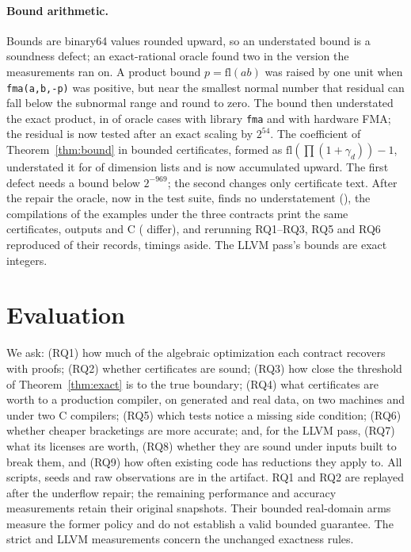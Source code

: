 \documentclass[acmsmall,review,anonymous,nonacm]{acmart}
\newcommand{\fl}{\mathrm{fl}}
\begin{document}
\paragraph{Bound arithmetic.} Bounds are binary64 values rounded upward, so an
understated bound is a soundness defect; an exact-rational oracle found two in
the version the measurements ran on. A product bound $p=\fl(ab)$ was raised by
one unit when \texttt{fma(a,b,-p)} was positive, but near the smallest normal
number that residual can fall below the subnormal range and round to zero. The
bound then understated the exact product, in \RepairMulUnderGeneric{} of
\RepairMulCases{} oracle cases with library \texttt{fma} and
\RepairMulUnderHaswell{} with hardware FMA; the residual is now tested after an
exact scaling by $2^{54}$. The coefficient of Theorem~\ref{thm:bound} in bounded
certificates, formed as $\fl(\prod(1+\gamma_d))-1$, understated it for
\RepairChainUnder{} of \RepairChainCases{} dimension lists and is now
accumulated upward. The first defect needs a bound below $2^{-969}$; the second
changes only certificate text. After the repair the oracle, now in the test
suite, finds no understatement (\RepairAfterUnder), the
\RepairExampleCases{} compilations of the \RepairExamplePrograms{} examples
under the three contracts print the same certificates, outputs and C
(\RepairExampleDiffer{} differ), and rerunning RQ1--RQ3, RQ5 and RQ6
reproduced \RepairRerunIdentical{} of their \RepairRerunRecords{} records,
timings aside. The LLVM pass's bounds are exact integers.

\section{Evaluation}\label{sec:eval}
We ask: (RQ1) how much of the algebraic optimization each contract recovers with
proofs; (RQ2) whether certificates are sound; (RQ3) how close the threshold of
Theorem~\ref{thm:exact} is to the true boundary; (RQ4) what certificates are
worth to a production compiler, on generated and real data, on two machines and
under two C compilers; (RQ5) which tests notice a missing side condition; (RQ6)
whether cheaper bracketings are more accurate; and, for the LLVM pass, (RQ7) what
its licenses are worth, (RQ8) whether they are sound under inputs built to break
them, and (RQ9) how often existing code has reductions they apply to. All
scripts, seeds and raw observations are in the artifact. RQ1 and RQ2 are
replayed after the underflow repair; the remaining performance and accuracy
measurements retain their original snapshots. Their bounded real-domain arms
measure the former policy and do not establish a valid bounded guarantee.
The strict and LLVM measurements concern the unchanged exactness rules.
\end{document}

